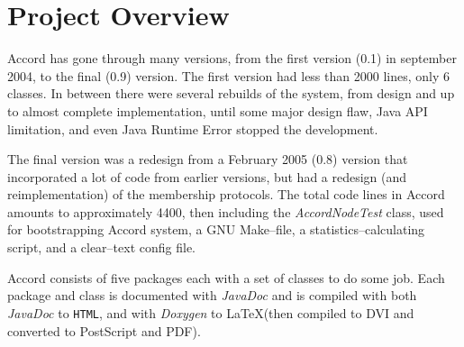 
\section{Project Overview}
\label{app:Code}

Accord has gone through many versions, from the first version (0.1)
 in september 2004, to the final (0.9) version. The first version had less than 2000 lines,
 only 6 classes. In between there were several rebuilds of the
 system, from design and up to almost complete implementation, until some major
 design flaw, Java API limitation, and even Java Runtime Error stopped the development.

The final version was a redesign from a February 2005 (0.8) version that incorporated a lot of code from
 earlier versions, but had a redesign (and reimplementation) of the membership
 protocols. The total code lines in Accord amounts to approximately 4400, then including
 the \emph{Accord\-Node\-Test} class, used for bootstrapping Accord system, a GNU Make--file,
 a statistics--calculating script, and a clear--text config file.

Accord consists of five packages each with a set of classes to do some job. Each package and class
 is documented with \emph{Java\-Doc} and is compiled with both \emph{Java\-Doc} to {\tt HTML}, and
 with \emph{Doxygen} to \LaTeX  (then compiled to DVI and converted to PostScript and PDF).

